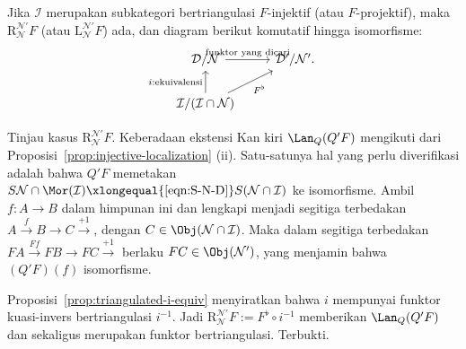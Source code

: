 \begin{proposisi}\label{prop:localization-injective}
	Jika $\mathcal{I}$ merupakan subkategori bertriangulasi $F$-injektif (atau
	$F$-projektif), maka $\mathrm{R}^{\mathcal{N}'}_{\mathcal{N}}F$ (atau
	$\mathrm{L}^{\mathcal{N}'}_{\mathcal{N}}F$) ada, dan diagram berikut
	komutatif hingga isomorfisme:
	\[\begin{tikzcd}
		\mathcal{D}/\mathcal{N} \arrow[r, "\text{funktor yang dicari}"] & \mathcal{D}'/\mathcal{N}' . \\
		\mathcal{I}/(\mathcal{I} \cap \mathcal{N}) \arrow[u, "{i: \text{ekuivalensi}}"] \arrow[ru, "{F^\flat}"'] &
	\end{tikzcd}\]
\end{proposisi}
\begin{bukti}
	Tinjau kasus $\mathrm{R}^{\mathcal{N}'}_{\mathcal{N}}F$. Keberadaan
	ekstensi Kan kiri $\Lan_Q(Q'F)$ mengikuti dari
	Proposisi~\ref{prop:injective-localization} (ii). Satu-satunya hal yang perlu
	diverifikasi adalah bahwa $Q'F$ memetakan
	$S\mathcal{N}\cap\Mor(\mathcal{I})
	\xlongequal{\eqref{eqn:S-N-D}}S(\mathcal{N}\cap\mathcal{I})$ ke
	isomorfisme. Ambil $f:A\to B$ dalam himpunan ini dan lengkapi menjadi
	segitiga terbedakan $A\xrightarrow{f}B\to C\xrightarrow{+1}$, dengan
	$C\in\Obj(\mathcal{N}\cap\mathcal{I})$. Maka dalam segitiga terbedakan
	$FA\xrightarrow{Ff}FB\to FC\xrightarrow{+1}$ berlaku
	$FC\in\Obj(\mathcal{N}')$, yang menjamin bahwa $(Q'F)(f)$ isomorfisme.

	Proposisi~\ref{prop:triangulated-i-equiv} menyiratkan bahwa $i$ mempunyai
	funktor kuasi-invers bertriangulasi $i^{-1}$. Jadi
	$\mathrm{R}^{\mathcal{N}'}_{\mathcal{N}}F:=F^\flat\circ i^{-1}$ memberikan
	$\Lan_Q(Q'F)$ dan sekaligus merupakan funktor bertriangulasi. Terbukti.
\end{bukti}

